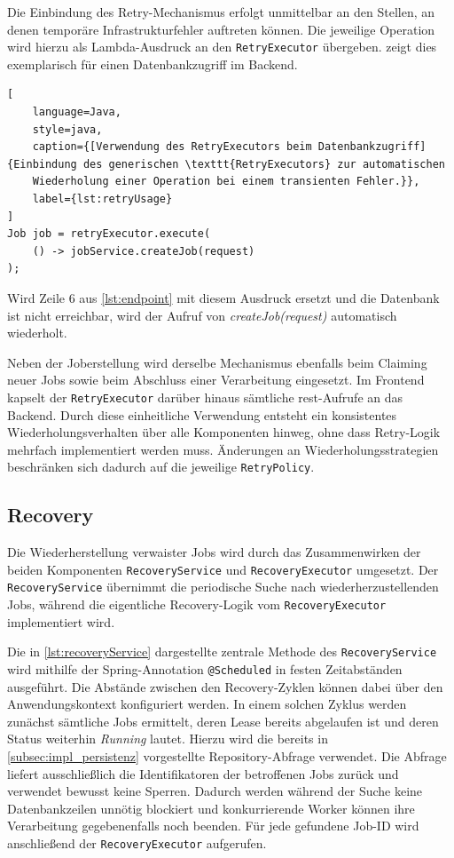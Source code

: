 Die Einbindung des Retry-Mechanismus erfolgt unmittelbar an den Stellen, an denen temporäre Infrastrukturfehler auftreten können.
Die jeweilige Operation wird hierzu als Lambda-Ausdruck an den \texttt{RetryExecutor} übergeben.
 zeigt dies exemplarisch für einen Datenbankzugriff im Backend.

\begin{lstlisting}[
    language=Java,
    style=java,
    caption={[Verwendung des RetryExecutors beim Datenbankzugriff]{Einbindung des generischen \texttt{RetryExecutors} zur automatischen
    Wiederholung einer Operation bei einem transienten Fehler.}},
    label={lst:retryUsage}
]
Job job = retryExecutor.execute(
    () -> jobService.createJob(request)
);
\end{lstlisting}

Wird Zeile 6 aus \cref{lst:endpoint} mit diesem Ausdruck ersetzt und die Datenbank ist nicht erreichbar,
wird der Aufruf von \textit{createJob(request)} automatisch wiederholt.

Neben der Joberstellung wird derselbe Mechanismus ebenfalls beim Claiming neuer Jobs sowie beim Abschluss einer Verarbeitung eingesetzt.
Im Frontend kapselt der \texttt{RetryExecutor} darüber hinaus sämtliche \gls{rest}-Aufrufe an das Backend.
Durch diese einheitliche Verwendung entsteht ein konsistentes Wiederholungsverhalten über alle Komponenten hinweg, ohne dass
Retry-Logik mehrfach implementiert werden muss.
Änderungen an Wiederholungsstrategien beschränken sich dadurch auf die jeweilige \texttt{RetryPolicy}.

\subsection{Recovery}
\label{subsec:impl_recovery}
Die Wiederherstellung verwaister Jobs wird durch das Zusammenwirken der beiden Komponenten \texttt{RecoveryService} und \texttt{RecoveryExecutor} umgesetzt.
Der \texttt{RecoveryService} übernimmt die periodische Suche nach wiederherzustellenden Jobs, während die eigentliche Recovery-Logik
vom \texttt{RecoveryExecutor} implementiert wird.

Die in \cref{lst:recoveryService} dargestellte zentrale Methode des \texttt{RecoveryService} wird mithilfe der
Spring-Annotation \texttt{@Scheduled} in festen Zeitabständen ausgeführt.
Die Abstände zwischen den Recovery-Zyklen können dabei über den Anwendungskontext konfiguriert werden.
In einem solchen Zyklus werden zunächst sämtliche Jobs ermittelt, deren Lease bereits abgelaufen ist und deren Status weiterhin \textit{Running} lautet.
Hierzu wird die bereits in \cref{subsec:impl_persistenz} vorgestellte Repository-Abfrage verwendet.
Die Abfrage liefert ausschließlich die Identifikatoren der betroffenen Jobs zurück und verwendet bewusst keine Sperren.
Dadurch werden während der Suche keine Datenbankzeilen unnötig blockiert und konkurrierende Worker können ihre Verarbeitung
gegebenenfalls noch beenden.
Für jede gefundene Job-ID wird anschließend der \texttt{RecoveryExecutor} aufgerufen.

